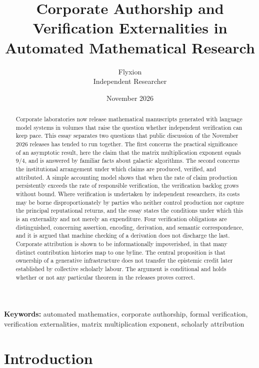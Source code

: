 \documentclass[12pt]{article}
\title{Corporate Authorship and Verification Externalities in Automated Mathematical Research}
\author{Flyxion\\Independent Researcher}
\date{November 2026}
\begin{document}
\maketitle
\thispagestyle{empty}

\begin{abstract}
\singlespacing
\noindent Corporate laboratories now release mathematical manuscripts generated with language model systems in volumes that raise the question whether independent verification can keep pace. This essay separates two questions that public discussion of the November 2026 releases has tended to run together. The first concerns the practical significance of an asymptotic result, here the claim that the matrix multiplication exponent equals $9/4$, and is answered by familiar facts about galactic algorithms. The second concerns the institutional arrangement under which claims are produced, verified, and attributed. A simple accounting model shows that when the rate of claim production persistently exceeds the rate of responsible verification, the verification backlog grows without bound. Where verification is undertaken by independent researchers, its costs may be borne disproportionately by parties who neither control production nor capture the principal reputational returns, and the essay states the conditions under which this is an externality and not merely an expenditure. Four verification obligations are distinguished, concerning assertion, encoding, derivation, and semantic correspondence, and it is argued that machine checking of a derivation does not discharge the last. Corporate attribution is shown to be informationally impoverished, in that many distinct contribution histories map to one byline. The central proposition is that ownership of a generative infrastructure does not transfer the epistemic credit later established by collective scholarly labour. The argument is conditional and holds whether or not any particular theorem in the releases proves correct.
\end{abstract}

\vspace{1.5em}
\noindent\textbf{Keywords:} automated mathematics, corporate authorship, formal verification, verification externalities, matrix multiplication exponent, scholarly attribution

\newpage
\onehalfspacing

\section{Introduction}
\end{document}
